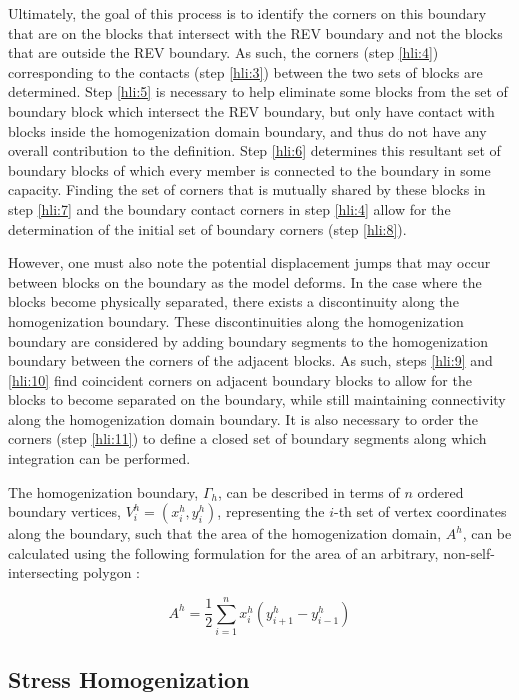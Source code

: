 Ultimately, the goal of this process is to identify the corners on this boundary that are on the blocks that intersect with the REV boundary and not the blocks that are outside the REV boundary. As such, the corners (step \ref{hli:4}) corresponding to the contacts (step \ref{hli:3}) between the two sets of blocks are determined. Step \ref{hli:5} is necessary to help eliminate some blocks from the set of boundary block which intersect the REV boundary, but only have contact with blocks inside the homogenization domain boundary, and thus do not have any overall contribution to the definition. Step \ref{hli:6} determines this resultant set of boundary blocks of which every member is connected to the boundary in some capacity. Finding the set of corners that is mutually shared by these blocks in step \ref{hli:7} and the boundary contact corners in step \ref{hli:4} allow for the determination of the initial set of boundary corners (step \ref{hli:8}).

However, one must also note the potential displacement jumps that may occur between blocks on the boundary as the model deforms. In the case where the blocks become physically separated, there exists a discontinuity along the homogenization boundary. These discontinuities along the homogenization boundary are considered by adding boundary segments to the homogenization boundary between the corners of the adjacent blocks. As such, steps \ref{hli:9} and \ref{hli:10} find coincident corners on adjacent boundary blocks to allow for the blocks to become separated on the boundary, while still maintaining connectivity along the homogenization domain boundary. It is also necessary to order the corners (step \ref{hli:11}) to define a closed set of boundary segments along which integration can be performed.

The homogenization boundary, $\Gamma_{h}$, can be described in terms of $n$ ordered boundary vertices, $V_{i}^{h}=(x_{i}^{h},y_{i}^{h})$, representing the $i$-th set of vertex coordinates along the boundary, such that the area of the homogenization domain, $A^{h}$, can be calculated using the following formulation for the area of an arbitrary, non-self-intersecting polygon \citep{Zwillinger_1995}: 

\begin{equation}
A^{h}=\dfrac{1}{2}\sum_{i=1}^{n}x_{i}^{h}(y_{i+1}^{h}-y_{i-1}^{h})
\label{eqn:hom1}
\end{equation}

\subsection{Stress Homogenization}

